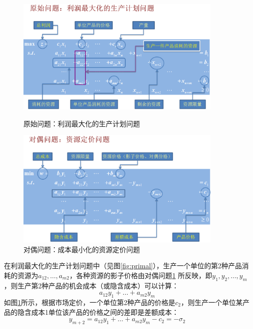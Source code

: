 \begin{figure}[htbp]
\begin{minipage}[t]{0.49\linewidth}
\centering
\includegraphics[width=0.9\textwidth]{figures/primal.eps}
\caption{原始问题：利润最大化的生产计划问题}\label{fig:primal}
\end{minipage}
\begin{minipage}[t]{0.49\linewidth}
\centering
\includegraphics[width=0.9\textwidth]{figures/dual.eps}
\caption{对偶问题：成本最小化的资源定价问题}\label{fig:dual}
\end{minipage}
\end{figure}

在利润最大化的生产计划问题中（见图\ref{fig:primal}），生产一个单位的第2种产品消耗的资源为$a_{12},\ldots, a_{m2}$，各种资源的影子价格由对偶问题\ref{fig:dual} 所反映，即$y_1,y_2,\ldots, y_m$，则生产第2种产品的机会成本（或隐含成本）可以计算：
\begin{equation}\label{eq:oppcost}
  a_{12}y_1 + \ldots + a_{m2}y_m
\end{equation}
如图\ref{fig:dual}所示，根据市场定价，一个单位第2种产品的价格是$c_2$，则生产一个单位某产品的隐含成本1单位该产品的价格之间的差即是差额成本：
\begin{equation}\label{eq:diffcost}
  y_{m+2} = a_{12}y_1 + \ldots + a_{m2}y_m - c_2 = -\sigma_2
\end{equation}

